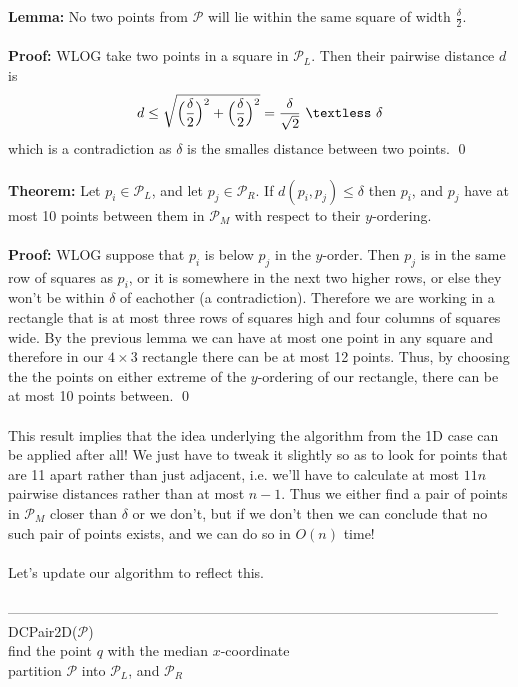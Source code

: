\documentclass{article}
\newcommand{\lt}{\textless}
\newcommand{\de}{\delta}
\newcommand{\thm}{\textbf{Theorem: }}
\newcommand{\lem}{\textbf{Lemma: }}
\newcommand{\proo}{\textbf{Proof: }}
\newcommand{\mcal}[1]{\mathcal{#1}}
\begin{document}
\lem No two points from $\mcal{P}$ will lie within the same square of width $\frac{\de}{2}$.\\\\
\proo WLOG take two points in a square in $\mcal{P}_L$. Then their pairwise distance $d$ is
\[d \leq \sqrt{\Big(\frac{\de}{2}\Big)^2 + \Big(\frac{\de}{2}\Big)^2} = \frac{\de}{\sqrt{2}}\ \lt\ \de\]
which is a contradiction as $\de$ is the smalles distance between two points.
\qed\\\\
\thm Let $p_i \in \mcal{P}_L$, and let $p_j \in \mcal{P}_R$. If $d(p_i, p_j) \leq \de$ then $p_i$, and $p_j$ have at most 10 points between them in $\mcal{P}_M$ with respect to their $y$-ordering.\\\\
\proo WLOG suppose that $p_i$ is below $p_j$ in the $y$-order. Then $p_j$ is in the same row of squares as $p_i$, or it is somewhere in the next two higher rows, or else they won't be within $\de$ of eachother (a contradiction). Therefore we are working in a rectangle that is at most three rows of squares high and four columns of squares wide. By the previous lemma we can have at most one point in any square and therefore in our $4 \times 3$ rectangle there can be at most 12 points. Thus, by choosing the the points on either extreme of the $y$-ordering of our rectangle, there can be at most 10 points between.
\qed\\\\
This result implies that the idea underlying the algorithm from the 1D case can be applied after all! We just have to tweak it slightly so as to look for points that are 11 apart rather than just adjacent, i.e. we'll have to calculate at most $11n$ pairwise distances rather than at most $n-1$. Thus we either find a pair of points in $\mcal{P}_M$ closer than $\de$ or we don't, but if we don't then we can conclude that no such pair of points exists, and we can do so in $O(n)$ time!\\\\
Let's update our algorithm to reflect this.\\\\
---------------------------------------------------------------------------------------------------------
DCPair2D($\mathcal{P}$)\\
	\hspace*{7mm} find the point $q$ with the median $x$-coordinate\\
	\hspace*{7mm} partition $\mcal{P}$ into $\mcal{P}_L$, and $\mcal{P}_R$\\\\
\end{document}
